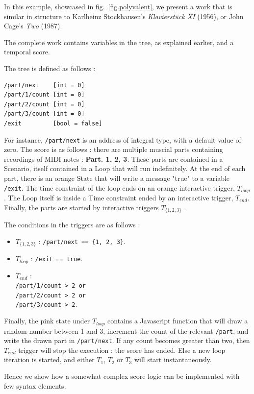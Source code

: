 \documentclass{article}
\begin{document}
In this example, showcased in fig.~\ref{fig.polyvalent}, we present a work that is similar in structure to Karlheinz Stockhausen's \emph{Klavierstück XI} (1956), or John Cage's \emph{Two} (1987). 

The complete work contains variables in the tree, as explained earlier, and a temporal score.

The tree is defined as follows : 
\begin{lstlisting}
/part/next    [int = 0]
/part/1/count [int = 0]
/part/2/count [int = 0]
/part/3/count [int = 0]
/exit         [bool = false]
\end{lstlisting}
For instance, \lstinline{/part/next} is an address of integral type, with a default value of zero. 
The score is as follows : there are multiple muscial parts containing recordings of MIDI notes : \textbf{Part. 1, 2, 3}.
These parts are contained in a Scenario, itself contained in a Loop that will run indefinitely. 
At the end of each part, there is an orange State that will write a message "true" to a variable \lstinline{/exit}.
The time constraint of the loop ends on an orange interactive trigger, $T_{loop}$.
The Loop itself is inside a Time constraint ended by an interactive trigger, $T_{end}$.
Finally, the parts are started by interactive triggers  $T_{\{1, 2, 3\}}$ .

The conditions in the triggers are as follows : 
\begin{itemize}
\item  $T_{\{1, 2, 3\}}$ : \lstinline|/part/next == {1, 2, 3}|.
\item $T_{loop}$ : \lstinline{/exit == true}.
\item $T_{end}$ : ~\\
\lstinline{/part/1/count > 2 or} \\
\lstinline{/part/2/count > 2 or} \\
\lstinline{/part/3/count > 2}.
\end{itemize}

Finally, the pink state under $T_{loop}$ contains a Javascript function 
that will draw a random number between 1 and 3, 
increment the count of the relevant \verb|/part|, 
and write the drawn part in \verb|/part/next|.
If any count becomes greater than two, then $T_{end}$
trigger will stop the execution : the score has ended. 
Else a new loop iteration is started, and either 
$T_1$, $T_2$ or $T_3$ will start instantaneously.

Hence we show how a somewhat complex score logic 
can be implemented with few syntax elements.
\end{document}
